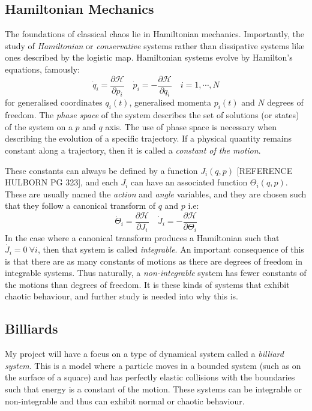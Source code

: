 \documentclass[12pt,a4paper]{amsart}
\begin{document}
\subsection{Hamiltonian Mechanics}

The foundations of classical chaos lie in Hamiltonian mechanics. Importantly, the study of \textit{Hamiltonian} or \textit{conservative} systems rather than dissipative systems like ones described by the logistic map. Hamiltonian systems evolve by Hamilton's equations, famously:
$$\dot{q}_{i} = \frac{\partial \mathcal{H}}{\partial p_{i}} \quad \dot{p}_{i} = -\frac{\partial \mathcal{H}}{\partial q_{i}} \quad i = 1, \cdots , N$$
for generalised coordinates $q_{i}(t)$, generalised momenta $p_{i}(t)$ and $N$ degrees of freedom. The \textit{phase space} of the system describes the set of solutions (or states) of the system on a $p$ and $q$ axis. The use of phase space is necessary when describing the evolution of a specific trajectory. If a physical quantity remains constant along a trajectory, then it is called a \textit{constant of the motion}. 

These constants can always be defined by a function $J_{i}(q, p)$ [REFERENCE HULBORN PG 323], and each $J_{i}$ can have an associated function $\Theta_{i}(q, p)$. These are usually named the \textit{action} and \textit{angle} variables, and they are chosen such that they follow a canonical transform of $q$ and $p$ i.e:
$$\dot{\Theta}_{i} = \frac{\partial \mathcal{H}}{\partial J_{i}} \quad \dot{J}_{i} = -\frac{\partial \mathcal{H}}{\partial \Theta_{i}}$$
In the case where a canonical transform produces a Hamiltonian such that $\dot{J_{i}} = 0 \ \forall i$, then that system is called \textit{integrable}. An important consequence of this is that there are as many constants of motions as there are degrees of freedom in integrable systems. Thus naturally, a \textit{non-integrable} system has fewer constants of the motions than degrees of freedom. It is these kinds of systems that exhibit chaotic behaviour, and further study is needed into why this is.

 

\subsection{Billiards}

My project will have a focus on a type of dynamical system called a \textit{billiard system}. This is a model where a particle moves in a bounded system (such as on the surface of a square) and has perfectly elastic collisions with the boundaries such that energy is a constant of the motion. These systems can be integrable or non-integrable and thus can exhibit normal or chaotic behaviour. 
\end{document}
